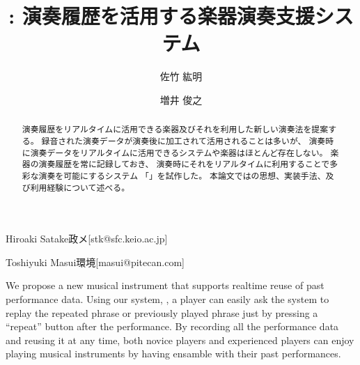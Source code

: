 \documentclass[submit,techreq]{ec2017}
\begin{document}
\title{{\system}: 演奏履歴を活用する楽器演奏支援システム}



\author{佐竹 紘明}{Hiroaki Satake}{政メ}[stk@sfc.keio.ac.jp]
\author{増井 俊之}{Toshiyuki Masui}{環境}[masui@pitecan.com]

\begin{abstract} %

演奏履歴をリアルタイムに活用できる楽器及びそれを利用した新しい演奏法を提案する。
%
録音された演奏データが演奏後に加工されて活用されることは多いが、
演奏時に演奏データをリアルタイムに活用できるシステムや楽器はほとんど存在しない。
%
 楽器の演奏履歴を常に記録しておき、
演奏時にそれをリアルタイムに利用することで多彩な演奏を可能にするシステム
「{\system}」を試作した。
%
本論文では{\system}の思想、実装手法、及び利用経験について述べる。

\end{abstract}


\begin{eabstract}

We propose a new musical instrument that supports realtime reuse of
past performance data.
%
Using our system, \textit{\system},
a player can easily ask the system to replay the repeated phrase or
previously played phrase just by pressing a ``repeat'' button after the performance.
%
By recording all the performance data and reusing it at any time,
both novice players and experienced players can enjoy playing musical instruments
by having ensamble with their past performances.

\end{eabstract}


\maketitle










\end{document}

